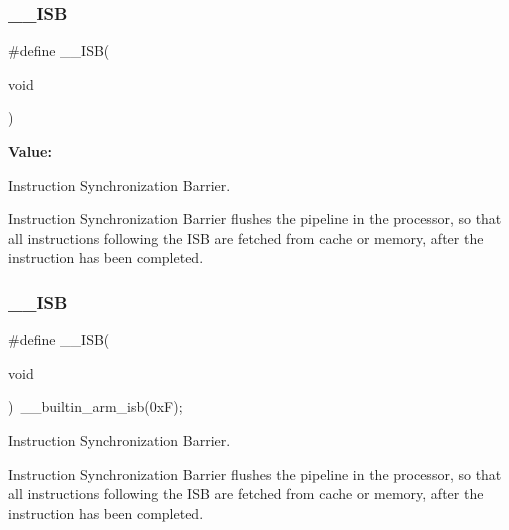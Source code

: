 \subsubsection{\texorpdfstring{\_\_ISB}{\_\_ISB}\hspace{0.1cm}{\footnotesize\ttfamily [1/2]}}
{\footnotesize\ttfamily \#define \+\_\+\+\_\+\+I\+SB(\begin{DoxyParamCaption}\item[{}]{void }\end{DoxyParamCaption})}

{\bfseries Value\+:}
\begin{DoxyCode}{0}
\DoxyCodeLine{\textcolor{keywordflow}{do} \{\(\backslash\)}

\end{DoxyCode}


Instruction Synchronization Barrier. 

Instruction Synchronization Barrier flushes the pipeline in the processor, so that all instructions following the I\+SB are fetched from cache or memory, after the instruction has been completed. \mbox{\label{group___c_m_s_i_s___core___instruction_interface_gaad233022e850a009fc6f7602be1182f6}} 
\subsubsection{\texorpdfstring{\_\_ISB}{\_\_ISB}\hspace{0.1cm}{\footnotesize\ttfamily [2/2]}}
{\footnotesize\ttfamily \#define \+\_\+\+\_\+\+I\+SB(\begin{DoxyParamCaption}\item[{}]{void }\end{DoxyParamCaption})~\+\_\+\+\_\+builtin\+\_\+arm\+\_\+isb(0x\+F);}



Instruction Synchronization Barrier. 

Instruction Synchronization Barrier flushes the pipeline in the processor, so that all instructions following the I\+SB are fetched from cache or memory, after the instruction has been completed. \mbox{\label{group___c_m_s_i_s___core___instruction_interface_gabd585ddc865fb9b7f2493af1eee1a572}} 
